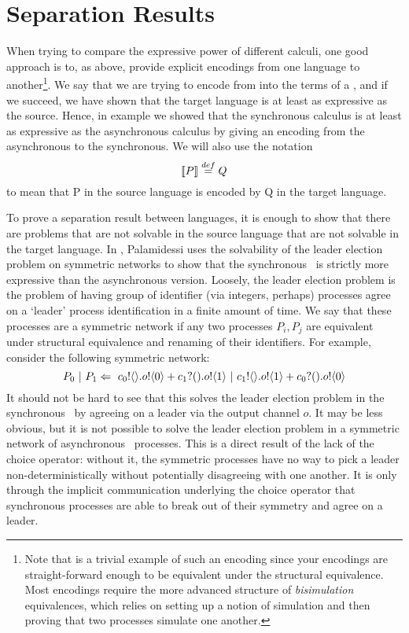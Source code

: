 \section{Separation Results}
When trying to compare the expressive power of different calculi, one good approach is to, as above, provide explicit encodings from one language to another\footnote{Note that  is a trivial example of such an encoding since your encodings are straight-forward enough to be equivalent under the structural equivalence.  Most encodings require the more advanced structure of \emph{bisimulation} equivalences, which relies on setting up a notion of simulation and then proving that two processes simulate one another.}.  We say that we are trying to encode from  into the terms of a , and if we succeed, we have shown that the target language is at least as expressive as the source.  Hence, in example  we showed that the synchronous calculus is at least as expressive as the asynchronous calculus by giving an encoding from the asynchronous to the synchronous.  We will also use the notation
\[
	\llbracket{P}\rrbracket \overset{\tiny{def}}{=} Q
\]
to mean that P in the source language is encoded by Q in the target language.

To prove a separation result between languages, it is enough to show that there are problems that are not solvable in the source language that are not solvable in the target language.  In \cite{palam03}, Palamidessi uses the solvability of the leader election problem on symmetric networks to show that the synchronous \picalc\ is strictly more expressive than the asynchronous version.  Loosely, the leader election problem is the problem of having group of identifier (via integers, perhaps) processes agree on a `leader' process identification in a finite amount of time.  We say that these processes are a symmetric network if any two processes $P_i, P_j$ are equivalent under structural equivalence and renaming of their identifiers.  For example, consider the following symmetric network:
\[
	P_0\ |\  P_1 \Leftarrow\  {c_0}!\langle{}\rangle. {o}!\langle{0}\rangle + {c_1}?({}). {o}!\langle{1}\rangle \ |\  {c_1}!\langle{}\rangle. {o}!\langle{1}\rangle + {c_0}?({}). {o}!\langle{0}\rangle
\]
It should not be hard to see that this solves the leader election problem in the synchronous \picalc\ by agreeing on a leader via the output channel $o$.  It may be less obvious, but it is not possible to solve the leader election problem in a symmetric network of asynchronous \picalc\ processes.  This is a direct result of the lack of the choice operator: without it, the symmetric processes have no way to pick a leader non-deterministically without potentially disagreeing with one another.  It is only through the implicit communication underlying the choice operator that synchronous processes are able to break out of their symmetry and agree on a leader.

